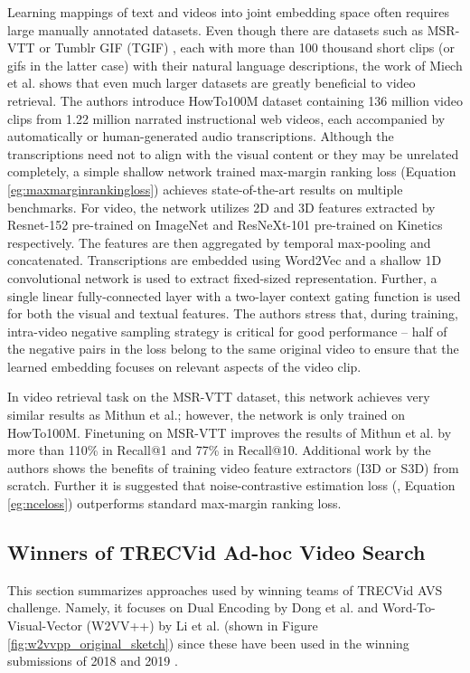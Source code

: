 Learning mappings of text and videos into joint embedding space often requires large manually annotated datasets. Even though there are datasets such as MSR-VTT or Tumblr GIF (TGIF) \cite{Li_2016_CVPR}, each with more than 100 thousand short clips (or gifs in the latter case) with their natural language descriptions, the work of Miech et al. \cite{Miech_2019_ICCV_HowTo100M} shows that even much larger datasets are greatly beneficial to video retrieval. The authors introduce HowTo100M dataset containing 136 million video clips from 1.22 million narrated instructional web videos, each accompanied by automatically or human-generated audio transcriptions. Although the transcriptions need not to align with the visual content or they may be unrelated completely, a simple shallow network trained max-margin ranking loss (Equation \ref{eg:maxmarginrankingloss}) achieves state-of-the-art results on multiple benchmarks.
For video, the network utilizes 2D and 3D features extracted by Resnet-152 pre-trained on ImageNet and ResNeXt-101 pre-trained on Kinetics respectively. The features are then aggregated by temporal max-pooling and concatenated. Transcriptions are embedded using Word2Vec and a shallow 1D convolutional network is used to extract fixed-sized representation. Further, a single linear fully-connected layer with a two-layer context gating function is used for both the visual and textual features. The authors stress that, during training, intra-video negative sampling strategy is critical for good performance -- half of the negative pairs in the loss belong to the same original video to ensure that the learned embedding focuses on relevant aspects of the video clip.

In video retrieval task on the MSR-VTT dataset, this network achieves very similar results as Mithun et al.; however, the network is only trained on HowTo\-100M. Finetuning on MSR-VTT improves the results of Mithun et al. by more than 110\% in Recall@1 and 77\% in Recall@10. Additional work by the authors \cite{Miech_2020_CVPR} shows the benefits of training video feature extractors (I3D or S3D) from scratch. Further it is suggested that noise-contrastive estimation loss (\cite{ExploringLimitsLanguageModeling}, Equation \ref{eg:nceloss}) outperforms standard max-margin ranking loss.


\subsection{Winners of TRECVid Ad-hoc Video Search}\label{sec:winnersOfTrecvid}
This section summarizes approaches used by winning teams of TRECVid AVS challenge. Namely, it focuses on Dual Encoding by Dong et al. \cite{Dong_2019_CVPR} and Word-To-Visual-Vector (W2VV++) by Li et al. \cite{XirongW2VVpp} (shown in Figure \ref{fig:w2vvpp_original_sketch}) since these have been used in the winning submissions of 2018 and 2019 \cite{wu2019hybrid, li2018renmin, li2019renmin}.


